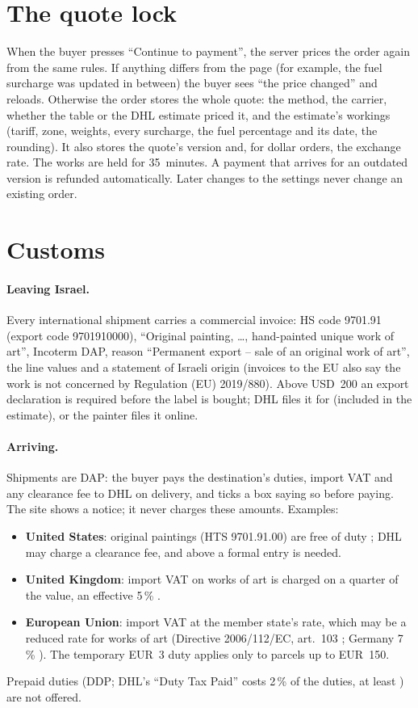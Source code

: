 \documentclass[11pt,a4paper]{article}
\newcommand{\nis}[1]{\text{NIS\,#1}}
\newcommand{\usd}[1]{\text{USD\,#1}}
\begin{document}
\section{The quote lock}
When the buyer presses ``Continue to payment'', the server prices the order again from the same
rules. If anything differs from the page (for example, the fuel surcharge was updated in between)
the buyer sees ``the price changed'' and reloads. Otherwise the order stores the whole quote: the
method, the carrier, whether the table or the DHL estimate priced it, and the estimate's workings
(tariff, zone, weights, every surcharge, the fuel percentage and its date, the rounding). It also
stores the quote's version and, for dollar orders, the exchange rate. The works are held for
35~minutes. A payment that arrives for an outdated version is refunded automatically. Later
changes to the settings never change an existing order.

\section{Customs}
\paragraph{Leaving Israel.} Every international shipment carries a commercial invoice: HS code
9701.91 (export code 9701910000), ``Original painting, \ldots, hand-painted unique work of art'',
Incoterm DAP, reason ``Permanent export -- sale of an original work of art'', the line values and
a statement of Israeli origin (invoices to the EU also say the work is not concerned by
Regulation (EU) 2019/880). Above USD~200 an export declaration is required before the label is
bought; DHL files it for \nis{129.80} (included in the estimate), or the painter files it online.

\paragraph{Arriving.} Shipments are DAP: the buyer pays the destination's duties, import VAT and
any clearance fee to DHL on delivery, and ticks a box saying so before paying. The site shows a
notice; it never charges these amounts. Examples:
\begin{itemize}
  \item \textbf{United States}: original paintings (HTS 9701.91.00) are free of duty
    \cite{usitc}; DHL may charge a clearance fee, and above \usd{2{,}500} a formal entry is needed.
  \item \textbf{United Kingdom}: import VAT on works of art is charged on a quarter of the value,
    an effective 5\,\% \cite{hmrc}.
  \item \textbf{European Union}: import VAT at the member state's rate, which may be a reduced
    rate for works of art (Directive 2006/112/EC, art.~103 \cite{vatdir}; Germany 7\,\%
    \cite{ustg}). The temporary EUR~3 duty applies only to parcels up to EUR~150.
\end{itemize}
Prepaid duties (DDP; DHL's ``Duty Tax Paid'' costs 2\,\% of the duties, at least \nis{67}) are
not offered.
\end{document}
